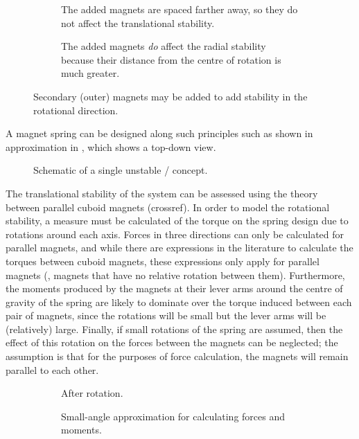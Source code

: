 \begin{figure}
  \begin{subfigure}
    \caption{
     The added magnets are spaced farther away,
     so they do not affect the
     translational stability.
     }
  \end{subfigure}
  \begin{subfigure}
    \caption{
      The added magnets \emph{do} affect the radial stability
      because their distance from the centre of rotation is much greater.
      }
  \end{subfigure}
  \caption{Secondary (outer) magnets may be added to add stability
      in the rotational direction.}
\end{figure}

A magnet spring can be designed along such principles such as shown in
approximation in , which shows a top-down view.

\begin{figure}
  \caption{Schematic of a single unstable \dof/ concept.}
\end{figure}

The translational stability of the system can be assessed using the theory between parallel cuboid magnets (crossref).
In order to model the rotational stability, a measure must be calculated of the torque on the spring design due to rotations around each axis.
Forces in three directions can only be calculated for parallel magnets, and while there are expressions in the literature to calculate the torques between cuboid magnets, these expressions only apply for parallel magnets (\ie, magnets that have no relative rotation between them).
Furthermore, the moments produced by the magnets at their lever arms around the centre of gravity of the spring are likely to dominate over the torque induced between each pair of magnets, since the rotations will be small but the lever arms will be (relatively) large.
Finally, if small rotations of the spring are assumed, then the effect of this rotation on the forces between the magnets can be neglected; the assumption is that for the purposes of force calculation, the magnets will remain parallel to each other.

\begin{figure}
  \begin{wide}
    \begin{subfigure}[0.4]
      \caption{After rotation.}
    \end{subfigure}\hfil
    \begin{subfigure}[0.4]
      \caption{Small-angle approximation for calculating forces and moments.}
    \end{subfigure}
  \end{wide}
  \caption{}
\end{figure}

